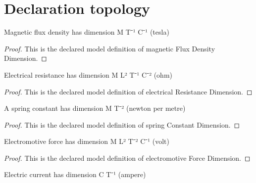 \section{Declaration topology}
\begin{definition}
  \label{def:physics:phyx-mini-0979:phyxminiproblems-problemphyxmini0979-magneticfluxdensitydimension}
  Magnetic flux density has dimension M T⁻¹ C⁻¹ (tesla)
\end{definition}
\begin{proof}
  This is the declared model definition of magnetic Flux Density Dimension.
\end{proof}
\begin{definition}
  \label{def:physics:phyx-mini-0979:phyxminiproblems-problemphyxmini0979-electricalresistancedimension}
  Electrical resistance has dimension M L² T⁻¹ C⁻² (ohm)
\end{definition}
\begin{proof}
  This is the declared model definition of electrical Resistance Dimension.
\end{proof}
\begin{definition}
  \label{def:physics:phyx-mini-0979:phyxminiproblems-problemphyxmini0979-springconstantdimension}
  A spring constant has dimension M T⁻² (newton per metre)
\end{definition}
\begin{proof}
  This is the declared model definition of spring Constant Dimension.
\end{proof}
\begin{definition}
  \label{def:physics:phyx-mini-0979:phyxminiproblems-problemphyxmini0979-electromotiveforcedimension}
  Electromotive force has dimension M L² T⁻² C⁻¹ (volt)
\end{definition}
\begin{proof}
  This is the declared model definition of electromotive Force Dimension.
\end{proof}
\begin{definition}
  \label{def:physics:phyx-mini-0979:phyxminiproblems-problemphyxmini0979-electriccurrentdimension}
  Electric current has dimension C T⁻¹ (ampere)
\end{definition}
